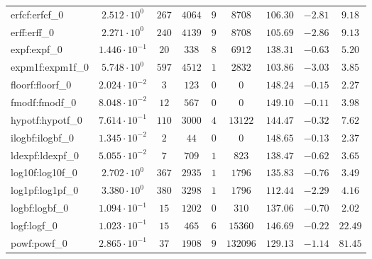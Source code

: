 \begin{tabular}{|l|c|c|c|c|c|c|c|c|}
erfcf:erfcf\_0               & $ 2.512 \cdot 10^{0}  $ & $ 267    $ & $ 4064   $ & $ 9   $ & $ 8708   $ & $ 106.30      $ & $ -2.81   $ & $ 9.18    $ \\
erff:erff\_0                 & $ 2.271 \cdot 10^{0}  $ & $ 240    $ & $ 4139   $ & $ 9   $ & $ 8708   $ & $ 105.69      $ & $ -2.86   $ & $ 9.13    $ \\
expf:expf\_0                 & $ 1.446 \cdot 10^{-1} $ & $ 20     $ & $ 338    $ & $ 8   $ & $ 6912   $ & $ 138.31      $ & $ -0.63   $ & $ 5.20    $ \\
expm1f:expm1f\_0             & $ 5.748 \cdot 10^{0}  $ & $ 597    $ & $ 4512   $ & $ 1   $ & $ 2832   $ & $ 103.86      $ & $ -3.03   $ & $ 3.85    $ \\
floorf:floorf\_0             & $ 2.024 \cdot 10^{-2} $ & $ 3      $ & $ 123    $ & $ 0   $ & $ 0      $ & $ 148.24      $ & $ -0.15   $ & $ 2.27    $ \\
fmodf:fmodf\_0               & $ 8.048 \cdot 10^{-2} $ & $ 12     $ & $ 567    $ & $ 0   $ & $ 0      $ & $ 149.10      $ & $ -0.11   $ & $ 3.98    $ \\
hypotf:hypotf\_0             & $ 7.614 \cdot 10^{-1} $ & $ 110    $ & $ 3000   $ & $ 4   $ & $ 13122  $ & $ 144.47      $ & $ -0.32   $ & $ 7.62    $ \\
ilogbf:ilogbf\_0             & $ 1.345 \cdot 10^{-2} $ & $ 2      $ & $ 44     $ & $ 0   $ & $ 0      $ & $ 148.65      $ & $ -0.13   $ & $ 2.37    $ \\
ldexpf:ldexpf\_0             & $ 5.055 \cdot 10^{-2} $ & $ 7      $ & $ 709    $ & $ 1   $ & $ 823    $ & $ 138.47      $ & $ -0.62   $ & $ 3.65    $ \\
log10f:log10f\_0             & $ 2.702 \cdot 10^{0}  $ & $ 367    $ & $ 2935   $ & $ 1   $ & $ 1796   $ & $ 135.83      $ & $ -0.76   $ & $ 3.49    $ \\
log1pf:log1pf\_0             & $ 3.380 \cdot 10^{0}  $ & $ 380    $ & $ 3298   $ & $ 1   $ & $ 1796   $ & $ 112.44      $ & $ -2.29   $ & $ 4.16    $ \\
logbf:logbf\_0               & $ 1.094 \cdot 10^{-1} $ & $ 15     $ & $ 1202   $ & $ 0   $ & $ 310    $ & $ 137.06      $ & $ -0.70   $ & $ 2.02    $ \\
logf:logf\_0                 & $ 1.023 \cdot 10^{-1} $ & $ 15     $ & $ 465    $ & $ 6   $ & $ 15360  $ & $ 146.69      $ & $ -0.22   $ & $ 22.49   $ \\
powf:powf\_0                 & $ 2.865 \cdot 10^{-1} $ & $ 37     $ & $ 1908   $ & $ 9   $ & $ 132096 $ & $ 129.13      $ & $ -1.14   $ & $ 81.45   $ \\

\end{tabular}
